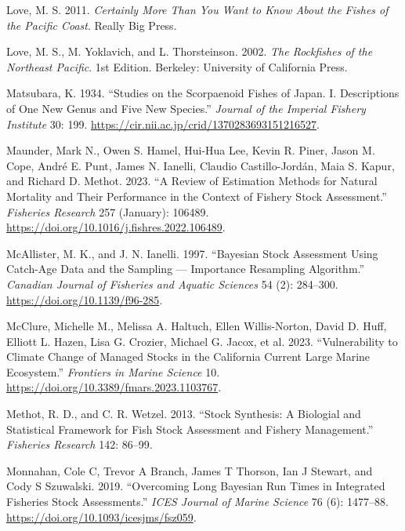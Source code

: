 \documentclass[
]{scrartcl}
\newlength{\cslhangindent}
\newenvironment{CSLReferences}[2] %
 {\begin{list}{}{%
  \setlength{\itemindent}{0pt}
  \setlength{\leftmargin}{0pt}
  \setlength{\parsep}{0pt}
  \ifodd #1
   \setlength{\leftmargin}{\cslhangindent}
   \setlength{\itemindent}{-1\cslhangindent}
  \fi
  \setlength{\itemsep}{#2\baselineskip}}}
 {\end{list}}
\begin{document}
\begin{CSLReferences}{1}{0}
Love, M. S. 2011. \emph{Certainly {More} {Than} {You} {Want} to {Know}
{About} the {Fishes} of the {Pacific} {Coast}}. Really Big Press.

Love, M. S., M. Yoklavich, and L. Thorsteinson. 2002. \emph{The
{Rockfishes} of the {Northeast} {Pacific}}. 1st Edition. Berkeley:
University of California Press.

Matsubara, K. 1934. {``Studies on the Scorpaenoid Fishes of Japan. I.
Descriptions of One New Genus and Five New Species.''} \emph{Journal of
the Imperial Fishery Institute} 30: 199.
\url{https://cir.nii.ac.jp/crid/1370283693151216527}.

Maunder, Mark N., Owen S. Hamel, Hui-Hua Lee, Kevin R. Piner, Jason M.
Cope, André E. Punt, James N. Ianelli, Claudio Castillo-Jordán, Maia S.
Kapur, and Richard D. Methot. 2023. {``A Review of Estimation Methods
for Natural Mortality and Their Performance in the Context of Fishery
Stock Assessment.''} \emph{Fisheries Research} 257 (January): 106489.
\url{https://doi.org/10.1016/j.fishres.2022.106489}.

McAllister, M. K., and J. N. Ianelli. 1997. {``Bayesian Stock Assessment
Using Catch-Age Data and the Sampling --- Importance Resampling
Algorithm.''} \emph{Canadian Journal of Fisheries and Aquatic Sciences}
54 (2): 284--300. \url{https://doi.org/10.1139/f96-285}.

McClure, Michelle M., Melissa A. Haltuch, Ellen Willis-Norton, David D.
Huff, Elliott L. Hazen, Lisa G. Crozier, Michael G. Jacox, et al. 2023.
{``Vulnerability to Climate Change of Managed Stocks in the {California
Current} Large Marine Ecosystem.''} \emph{Frontiers in Marine Science}
10. \url{https://doi.org/10.3389/fmars.2023.1103767}.

Methot, R. D., and C. R. Wetzel. 2013. {``Stock Synthesis: A Biologial
and Statistical Framework for Fish Stock Assessment and Fishery
Management.''} \emph{Fisheries Research} 142: 86--99.

Monnahan, Cole C, Trevor A Branch, James T Thorson, Ian J Stewart, and
Cody S Szuwalski. 2019. {``Overcoming Long Bayesian Run Times in
Integrated Fisheries Stock Assessments.''} \emph{{ICES} Journal of
Marine Science} 76 (6): 1477--88.
\url{https://doi.org/10.1093/icesjms/fsz059}.


\end{CSLReferences}
\end{document}
